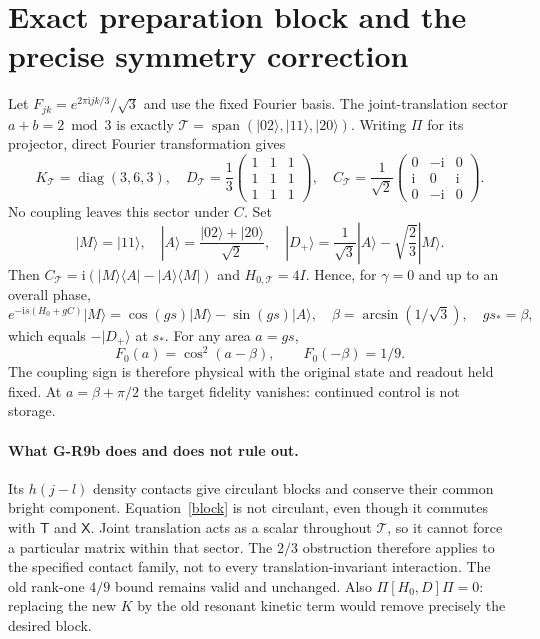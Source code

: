 \documentclass[11pt,a4paper]{article}
\newcommand{\ii}{\mathrm i}
\newcommand{\ket}[1]{|#1\rangle}
\newcommand{\bra}[1]{\langle#1|}
\begin{document}
\newpage
\section{Exact preparation block and the precise symmetry correction}
Let $F_{jk}=e^{2\pi\ii jk/3}/\sqrt3$ and use the fixed Fourier basis.
The joint-translation sector $a+b=2\bmod3$ is exactly
$\mathcal T=\operatorname{span}(\ket{02},\ket{11},\ket{20})$.
Writing $\Pi$ for its projector, direct Fourier transformation gives
\begin{equation}
 K_{\mathcal T}=\operatorname{diag}(3,6,3),\quad
 D_{\mathcal T}=\frac13\begin{pmatrix}1&1&1\\1&1&1\\1&1&1\end{pmatrix},\quad
 C_{\mathcal T}=\frac1{\sqrt2}
 \begin{pmatrix}0&-\ii&0\\\ii&0&\ii\\0&-\ii&0\end{pmatrix}.\label{block}
\end{equation}
No coupling leaves this sector under $C$. Set
\begin{equation}
 \ket M=\ket{11},\quad \ket A=\frac{\ket{02}+\ket{20}}{\sqrt2},\quad
 \ket{D_+}=\frac1{\sqrt3}\ket A-\sqrt{\frac23}\ket M.
\end{equation}
Then $C_{\mathcal T}=\ii(\ket M\bra A-\ket A\bra M)$ and
$H_{0,\mathcal T}=4I$. Hence, for $\gamma=0$ and up to an overall phase,
\begin{equation}
 e^{-\ii s(H_0+gC)}\ket M
 =\cos(gs)\ket M-\sin(gs)\ket A,\quad
 \beta=\arcsin(1/\sqrt3),\quad gs_* =\beta,\label{prep}
\end{equation}
which equals $-\ket{D_+}$ at $s_*$. For any area $a=gs$,
\begin{equation}
 F_0(a)=\cos^2(a-\beta),\qquad F_0(-\beta)=1/9.\label{area}
\end{equation}
The coupling sign is therefore physical with the original state and
readout held fixed. At $a=\beta+\pi/2$ the target fidelity vanishes:
continued control is not storage.

\paragraph{What G-R9b does and does not rule out.}
Its $h(j-l)$ density contacts give circulant blocks and conserve their
common bright component. Equation~\eqref{block} is not circulant, even
though it commutes with $\mathsf T$ and $\mathsf X$. Joint translation
acts as a scalar throughout $\mathcal T$, so it cannot force a particular
matrix within that sector. The $2/3$ obstruction therefore applies to
the specified contact family, not to every translation-invariant
interaction. The old rank-one $4/9$ bound remains valid and unchanged.
Also $\Pi[H_0,D]\Pi=0$: replacing the new $K$ by the old resonant kinetic
term would remove precisely the desired block.
\end{document}
